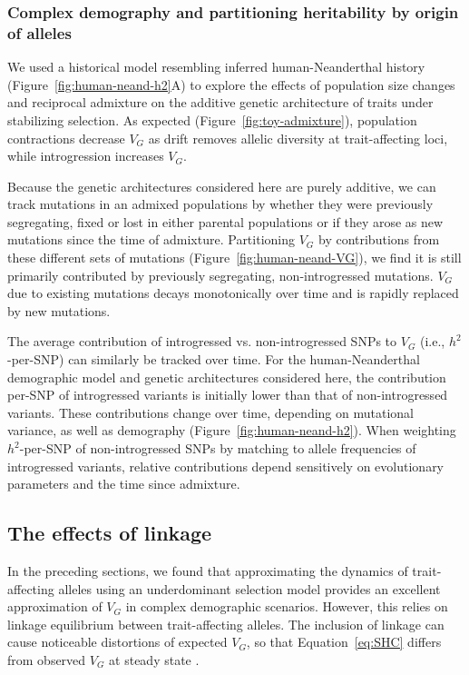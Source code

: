 \documentclass[10pt,letterpaper]{article}
\begin{document}
\subsubsection*{Complex demography and partitioning heritability by origin of
alleles}

We used a historical model resembling inferred human-Neanderthal history
(Figure~\ref{fig:human-neand-h2}A) to explore the effects of population size
changes and reciprocal admixture on the additive genetic architecture of traits
under stabilizing selection. As expected (Figure~\ref{fig:toy-admixture}),
population contractions decrease $V_G$ as drift removes allelic diversity at
trait-affecting loci, while introgression increases $V_G$.

Because the genetic architectures considered here are purely additive, we can
track mutations in an admixed populations by whether they were previously
segregating, fixed or lost in either parental populations or if they arose as
new mutations since the time of admixture. Partitioning $V_G$ by contributions
from these different sets of mutations (Figure~\ref{fig:human-neand-VG}), we
find it is still primarily contributed by previously segregating,
non-introgressed mutations. $V_G$ due to existing mutations decays
monotonically over time and is rapidly replaced by new mutations.

The average contribution of introgressed vs. non-introgressed SNPs to $V_G$
(i.e., $h^2$-per-SNP) can similarly be tracked over time. For the
human-Neanderthal demographic model and genetic architectures considered
here, the contribution per-SNP of introgressed variants is initially lower than
that of non-introgressed variants. These contributions change over time,
depending on mutational variance, as well as demography
(Figure~\ref{fig:human-neand-h2}). When weighting $h^2$-per-SNP of
non-introgressed SNPs by matching to allele frequencies of introgressed
variants, relative contributions depend sensitively on evolutionary parameters
and the time since admixture.

\subsection*{The effects of linkage}

In the preceding sections, we found that approximating the dynamics of
trait-affecting alleles using an underdominant selection model
\cite{robertson1956effect} provides an excellent approximation of $V_G$ in
complex demographic scenarios. However, this relies on linkage equilibrium
between trait-affecting alleles. The inclusion of linkage can cause noticeable
distortions of expected $V_G$, so that Equation~\ref{eq:SHC} differs from
observed $V_G$ at steady state \cite{burger1989much, burger1994distribution,
walsh2018evolution}.
\end{document}
